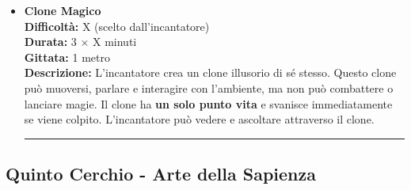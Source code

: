 \documentclass[./magie.tex]{subfiles}
\begin{document}
\begin{itemize}
\vspace{0.2cm}
\noindent
\begin{center}
\rule{\textwidth}{0.4pt} 
\end{center}
\vspace{0.2cm}

\item \textbf{Clone Magico} \\
\textbf{Difficoltà:} X (scelto dall'incantatore) \\
\textbf{Durata:} 3 × X minuti \\
\textbf{Gittata:} 1 metro \\
\textbf{Descrizione:} L'incantatore crea un clone illusorio di sé stesso. Questo clone può muoversi, parlare e interagire con l’ambiente, ma non può combattere o lanciare magie. Il clone ha \textbf{un solo punto vita} e svanisce immediatamente se viene colpito. L'incantatore può vedere e ascoltare attraverso il clone.

\vspace{0.2cm}
\noindent
\begin{center}
\rule{\textwidth}{0.4pt} 
\end{center}
\vspace{0.2cm}

\end{itemize}

\clearpage
\subsection*{Quinto Cerchio - Arte della Sapienza}
\end{document}

